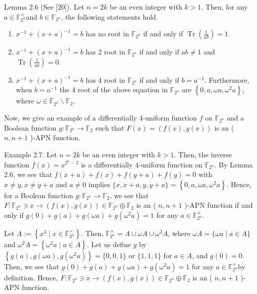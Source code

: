 \documentclass[10pt]{article}
\begin{document}
Lemma 2.6 (See [20]). Let $n=2 k$ be an even integer with $k>1$. Then, for any $a \in \mathbb{F}_{2^{n}}^{\times}$and $b \in \mathbb{F}_{2^{n}}$, the following statements hold.

\begin{enumerate}
  \item $x^{-1}+(x+a)^{-1}=b$ has no root in $\mathbb{F}_{2^{n}}$ if and only if $\operatorname{Tr}\left(\frac{1}{a b}\right)=1$.
  \item $x^{-1}+(x+a)^{-1}=b$ has 2 root in $\mathbb{F}_{2^{n}}$ if and only if $a b \neq 1$ and $\operatorname{Tr}\left(\frac{1}{a b}\right)=0$.
  \item $x^{-1}+(x+a)^{-1}=b$ has 4 root in $\mathbb{F}_{2^{n}}$ if and only if $b=a^{-1}$. Furthermore, when $b=a^{-1}$ the 4 root of the above equation in $\mathbb{F}_{2^{n}}$ are $\left\{0, a, \omega a, \omega^{2} a\right\}$, where $\omega \in \mathbb{F}_{2^{2}} \backslash \mathbb{F}_{2}$.
\end{enumerate}

Now, we give an example of a differentially 4-uniform function $f$ on $\mathbb{F}_{2^{n}}$ and a Boolean function $g: \mathbb{F}_{2^{n}} \rightarrow \mathbb{F}_{2}$ such that $F(x)=(f(x), g(x))$ is an ( $n, n+1$ )-APN function.

Example 2.7. Let $n=2 k$ be an even integer with $k>1$. Then, the inverse function $f(x)=x^{2^{n}-2}$ is a differentially 4-uniform function on $\mathbb{F}_{2^{n}}$. By Lemma 2.6, we see that $f(x+a)+f(x)+f(y+a)+f(y)=0$ with $x \neq y, x \neq y+a$ and $a \neq 0$ implies $\{x, x+a, y, y+a\}=\left\{0, a, \omega a, \omega^{2} a\right\}$. Hence, for a Boolean function $g: \mathbb{F}_{2^{n}} \rightarrow \mathbb{F}_{2}$, we see that $F: \mathbb{F}_{2^{n}} \ni x \rightarrow(f(x), g(x)) \in \mathbb{F}_{2^{n}} \oplus \mathbb{F}_{2}$ is an ( $n, n+1$ )-APN function if and only if $g(0)+g(a)+g(\omega a)+g\left(\omega^{2} a\right)=1$ for any $a \in \mathbb{F}_{2^{n}}^{\times}$.

Let $A:=\left\{x^{3} \mid x \in \mathbb{F}_{2^{n}}^{\times}\right\}$. Then, $\mathbb{F}_{2^{n}}^{\times}=A \cup \omega A \cup \omega^{2} A$, where $\omega A=\{\omega a \mid a \in A\}$ and $\omega^{2} A=\left\{\omega^{2} a \mid a \in A\right\}$. Let us define $g$ by $\left\{g(a), g(\omega a), g\left(\omega^{2} a\right)\right\}=\{0,0,1\}$ or $\{1,1,1\}$ for $a \in A$, and $g(0)=0$. Then, we see that $g(0)+g(a)+g(\omega a)+g\left(\omega^{2} a\right)=1$ for any $a \in \mathbb{F}_{2^{n}}^{\times}$by definition. Hence, $F: \mathbb{F}_{2^{n}} \ni x \rightarrow(f(x), g(x)) \in \mathbb{F}_{2^{n}} \oplus \mathbb{F}_{2}$ is an ( $n, n+1$ )-APN function.
\end{document}
